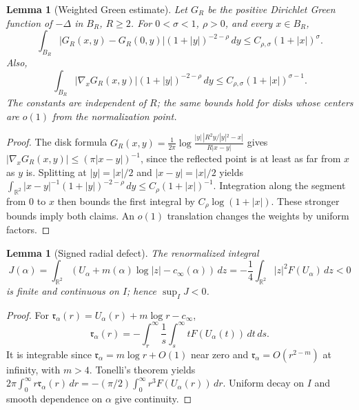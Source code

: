 \documentclass[11pt,reqno]{amsart}
\numberwithin{equation}{section}
\newtheorem{lemma}[theorem]{Lemma}
\theoremstyle{definition}
\theoremstyle{remark}
\newcommand{\R}{\mathbb R}
\begin{document}
\begin{lemma}[Weighted Green estimate]\label{lem:weighted-green}
Let $G_R$ be the positive Dirichlet Green function of $-\Delta$ in
$B_R$, $R\ge2$. For $0<\sigma<1$, $\rho>0$, and every $x\in B_R$,
\begin{equation}\label{eq:weighted-green}
 \int_{B_R}|G_R(x,y)-G_R(0,y)|(1+|y|)^{-2-\rho}\,dy
 \le C_{\rho,\sigma}(1+|x|)^\sigma.
\end{equation}
Also,
\begin{equation}\label{eq:weighted-green-gradient}
 \int_{B_R}|\nabla_xG_R(x,y)|(1+|y|)^{-2-\rho}\,dy
 \le C_{\rho,\sigma}(1+|x|)^{\sigma-1}.
\end{equation}
The constants are independent of $R$; the same bounds hold for disks
whose centers are $o(1)$ from the normalization point.
\end{lemma}
\begin{proof}
The disk formula
\(
 G_R(x,y)=\frac1{2\pi}\log
 \frac{|y|\,|R^2y/|y|^2-x|}{R|x-y|}
\)
gives $|\nabla_xG_R(x,y)|\le(\pi|x-y|)^{-1}$, since the reflected
point is at least as far from $x$ as $y$ is. Splitting at
$|y|=|x|/2$ and $|x-y|=|x|/2$ yields
$\int_{\R^2}|x-y|^{-1}(1+|y|)^{-2-\rho}\,dy
\le C_\rho(1+|x|)^{-1}$.
Integration along the segment from $0$ to $x$ then bounds the first
integral by $C_\rho\log(1+|x|)$. These stronger bounds imply both
claims. An $o(1)$ translation changes the weights by uniform factors.
\end{proof}

\begin{lemma}[Signed radial defect]\label{lem:J-negative}
The renormalized integral
\begin{equation}\label{eq:J-def}
 J(\alpha)=\int_{\R^2}
  (U_\alpha+m(\alpha)\log|z|-c_\infty(\alpha))\,dz
 =-\frac14\int_{\R^2}|z|^2F(U_\alpha)\,dz<0
\end{equation}
is finite and continuous on $I$; hence $\sup_IJ<0$.
\end{lemma}
\begin{proof}
For $\mathfrak r_\alpha(r)=U_\alpha(r)+m\log r-c_\infty$,
\begin{equation}\label{eq:R-representation}
 \mathfrak r_\alpha(r)=-\int_r^\infty\frac1s
                  \int_s^\infty tF(U_\alpha(t))\,dt\,ds.
\end{equation}
It is integrable since $\mathfrak r_\alpha=m\log r+O(1)$ near zero and
$\mathfrak r_\alpha=O(r^{2-m})$ at infinity, with $m>4$.
Tonelli's theorem yields
$2\pi\int_0^\infty r\mathfrak r_\alpha(r)\,dr
=-(\pi/2)\int_0^\infty r^3F(U_\alpha(r))\,dr$.
Uniform decay on $I$ and smooth dependence on $\alpha$ give continuity.
\end{proof}
\end{document}
